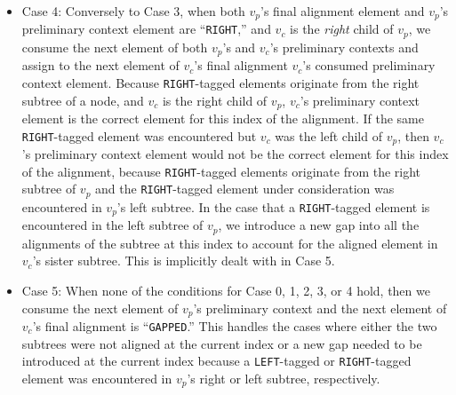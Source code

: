 \documentclass{bmcart}
\begin{document}
\begin{itemize}
  \item Case 4: Conversely to Case 3, when both $v_p$'s final alignment element and $v_p$'s preliminary context element are ``\texttt{RIGHT},'' and $v_c$ is the \textit{right} child of $v_p$, we consume the next element of both $v_p$'s and $v_c$'s preliminary contexts and assign to the next element of $v_c$'s final alignment $v_c$'s consumed preliminary context element.
  Because \texttt{RIGHT}-tagged elements originate from the right subtree of a node, and $v_c$ is the right child of $v_p$, $v_c$'s preliminary context element is the correct element for this index of the alignment.
  If the same \texttt{RIGHT}-tagged element was encountered but $v_c$ was the left child of $v_p$, then $v_c$'s preliminary context element would not be the correct element for this index of the alignment, because \texttt{RIGHT}-tagged elements originate from the right subtree of $v_p$ and the \texttt{RIGHT}-tagged element under consideration was encountered in $v_p$'s left subtree.
  In the case that a \texttt{RIGHT}-tagged element is encountered in the left subtree of $v_p$, we introduce a new gap into all the alignments of the subtree at this index to account for the aligned element in $v_c$'s sister subtree.
  This is implicitly dealt with in Case 5.
  
  \item Case 5: When none of the conditions for Case 0, 1, 2, 3, or 4 hold, then we consume the next element of $v_p$'s preliminary context and the next element of $v_c$'s final alignment is ``\texttt{GAPPED}.''
  This handles the cases where either the two subtrees were not aligned at the current index or a new gap needed to be introduced at the current index because a \texttt{LEFT}-tagged or \texttt{RIGHT}-tagged element was encountered in $v_p$'s right or left subtree, respectively. 

\end{itemize}
\end{document}
